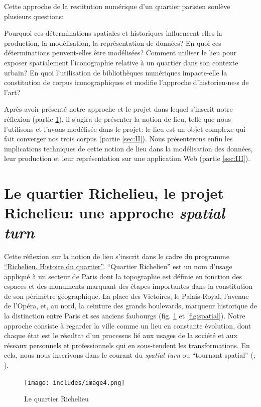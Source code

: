 \documentclass[11pt,french]{article}
\begin{document}
Cette approche de la restitution numérique d'un quartier parisien soulève plusieurs questions:

Pourquoi ces déterminations spatiales et historiques influencent-elles la production, la modélisation, la représentation de données? En quoi ces déterminations peuvent-elles être modélisées? Comment utiliser le lieu pour exposer spatialement l'iconographie relative à un quartier dans son contexte urbain? En quoi l'utilisation de bibliothèques numériques impacte-elle la constitution de corpus iconographiques et modifie l'approche d'historien$\cdot$ne$\cdot$s de l'art?

Après avoir présenté notre approche et le projet dans lequel s'inscrit notre réflexion (partie \ref{sec:I}), il s'agira de présenter la notion de lieu, telle que nous l'utilisons et l'avons modélisée dans le projet: le lieu est un objet complexe qui fait converger nos trois corpus (partie \ref{sec:II}). Nous présenterons enfin les implications techniques de cette notion de lieu dans la modélisation des données, leur production et leur représentation sur une application Web (partie \ref{sec:III}).

\section{Le quartier Richelieu, le projet Richelieu: une approche \textit{spatial turn}}
\label{sec:I}
Cette réflexion sur la notion de lieu s'inscrit dans le cadre du programme \href{https://quartier-richelieu.inha.fr}{\enquote{Richelieu. Histoire du quartier}}. \enquote{Quartier Richelieu} est un nom d'usage appliqué à un secteur de Paris dont la topographie est définie en fonction des espaces et des monuments marquant des étapes importantes dans la constitution de son périmètre géographique. La place des Victoires, le Palais-Royal, l'avenue de l'Opéra, et, au nord, la ceinture des grands boulevards, marqueur historique de la distinction entre Paris et ses anciens faubourgs (fig. \ref{fig:quartier} et \ref{fig:spatial}). Notre approche consiste à regarder la ville comme un lieu en constante évolution, dont chaque état est le résultat d'un processus lié aux usages de la société et aux réseaux personnels et professionnels qui en sous-tendent les transformations. En cela, nous nous inscrivons dans le courant du \textit{spatial turn} ou \enquote{tournant spatial} (\citealp[p. 15-16]{bodenhamer_potential_2010}; \citealp{ayers_turning_2010}).

\begin{figure}[h!]
	\centering
	\texttt{[image: includes/image4.png]}
	\caption{Le quartier Richelieu}
	\label{fig:quartier}
\end{figure}
\end{document}
